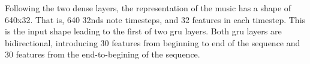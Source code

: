 
Following the two dense layers, the representation of the
music has a shape of 640x32. That is, 640 \glspl{32nd} note
timesteps, and 32 features in each timestep. This is the
input shape leading to the first of two \gls{gru} layers.
Both \gls{gru} layers are bidirectional, introducing 30
features from beginning to end of the sequence and 30
features from the end-to-begining of the sequence.
